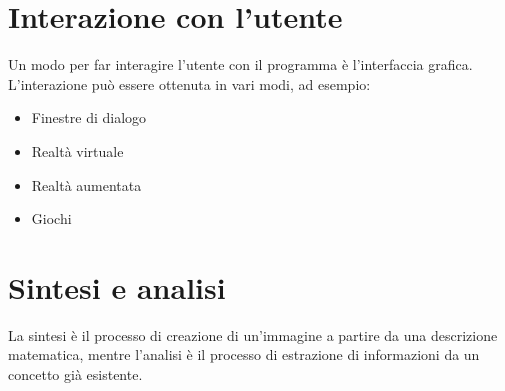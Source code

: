 \documentclass[a4paper]{article}
\begin{document}


\tableofcontents
\pagebreak

\section{Interazione con l'utente}
Un modo per far interagire l'utente con il programma è l'interfaccia grafica. L'interazione
può essere ottenuta in vari modi, ad esempio:
\begin{itemize}
    \item Finestre di dialogo
    \item Realtà virtuale
    \item Realtà aumentata
    \item Giochi
\end{itemize}

\section{Sintesi e analisi}
La sintesi è il processo di creazione di un'immagine a partire da una descrizione matematica,
mentre l'analisi è il processo di estrazione di informazioni da un concetto già esistente.
\end{document}
